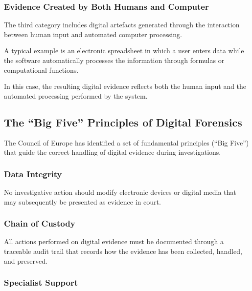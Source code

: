 \subsubsection{Evidence Created by Both Humans and Computer}

\noindent
The third category includes digital artefacts generated through the interaction between human input and automated computer processing.

\medskip

\noindent
A typical example is an electronic spreadsheet in which a user enters data while the software automatically processes the information through formulas or computational functions.

\medskip

\noindent
In this case, the resulting digital evidence reflects both the human input and the automated processing performed by the system.

\medskip


\subsection{The ``Big Five'' Principles of Digital Forensics}

\noindent
The Council of Europe has identified a set of fundamental principles (``Big Five'') that guide the correct handling of digital evidence during investigations.

\medskip

\subsubsection*{Data Integrity}

\noindent
No investigative action should modify electronic devices or digital media that may subsequently be presented as evidence in court.

\medskip

\subsubsection*{Chain of Custody}

\noindent
All actions performed on digital evidence must be documented through a traceable audit trail that records how the evidence has been collected, handled, and preserved.

\medskip

\subsubsection*{Specialist Support}


